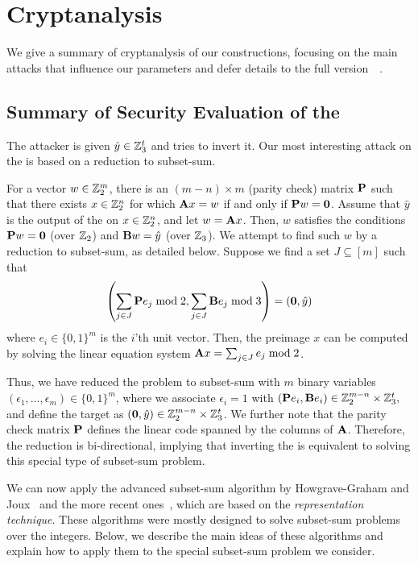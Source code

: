 \section{Cryptanalysis}
\label{sec:cryptanalysis}

\newcommand{\zerovec}{\textbf{0}}

We give a summary of cryptanalysis of our constructions, focusing on the main attacks that influence our parameters and defer details to the full version~~\cite{fullversion}.

\subsection{Summary of Security Evaluation of the \ttOWF}

The attacker is given $\hat{y} \in \mathbb{Z}_3^t$ and tries to invert it. Our most interesting attack on the \ttOWF is based on a reduction to subset-sum.

For a vector $w \in \mathbb{Z}_2^m$, there is an $(m -n) \times m$ (parity check) matrix $\mat{P}$ such that there exists $x \in \mathbb{Z}_2^n$ for which $\mat{A}x = w$ if and only if $\mat{P} w=\zerovec$. Assume that $\hat{y}$ is the output of the \ttOWF on $x \in \mathbb{Z}_2^n$, and let $w = \mat{A}x$. Then, $w$ satisfies the conditions $\mat{P} w = \zerovec$ (over $\mathbb{Z}_2$) and $\mat{B}w = \hat{y}$ (over $\mathbb{Z}_3$). We attempt to find such $w$ by a reduction to subset-sum, as detailed below. Suppose we find a set $J \subseteq [m]$ such that
$$
\left( \sum_{j \in J} \mat{P}e_j  \bmod 2, \sum_{j \in J} \mat{B}e_j  \bmod 3 \right) = (\zerovec,\hat{y})
$$
where $e_i \in \{0,1\}^m$ is the $i$'th unit vector. Then, the preimage $x$ can be computed by solving the linear equation system $\mat{A}x = \sum_{j \in J} e_j  \bmod 2$.

Thus, we have reduced the problem to subset-sum with $m$ binary variables
$(\epsilon_1, \ldots, \epsilon_m) \in \{0,1\}^m$, where we associate $\epsilon_i = 1$
with $(\mat{P}e_i, \mat{B}e_i) \in \Z_2^{m-n} \times \Z_3^t,$ and define the target as $(\zerovec,\hat{y}) \in \Z_2^{m-n} \times \Z_3^t$. We further note that the parity check matrix $\mat{P}$ defines the linear code spanned by the columns of $\mat{A}$. Therefore, the reduction is bi-directional, implying that inverting the \ttOWF is equivalent to solving this special type of subset-sum problem.


We can now apply the advanced subset-sum algorithm by Howgrave{-}Graham and Joux~\cite{Howgrave-GrahamJ10} and the more recent ones~\cite{BeckerCJ11,BonnetainBSS20}, which are based on the \emph{representation technique}. These algorithms were mostly designed to solve subset-sum problems over the integers. Below, we describe the main ideas of these algorithms and explain how to apply them to the special subset-sum problem we consider.

